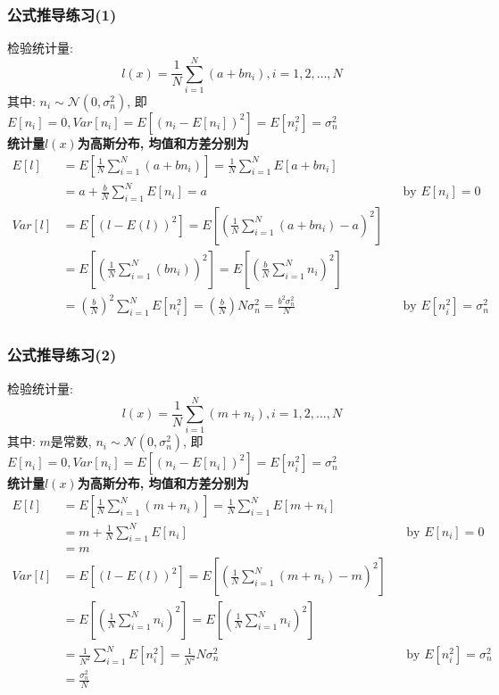 \begin{frame}[shrink]
\frametitle{公式推导练习(1)}
检验统计量:
\[l(x)=\frac{1}{N}\sum\limits_{i=1}^{N}(a+bn_i), i=1,2,\dots,N\]
其中: $n_i\sim\mathcal{N}(0,\sigma_n^2)$, 即$E[n_i]=0,Var[n_i]=E\left[(n_i-E[n_i])^2\right]=E[n_i^2]=\sigma_n^2$\\
\textbf{统计量$l(x)$为高斯分布, 均值和方差分别为}
\begin{align*}
E[l]&=E\left[\frac{1}{N}\sum\limits_{i=1}^{N}(a+bn_i)\right]=\frac{1}{N}\sum\limits_{i=1}^{N}E[a+bn_i]\\
&=a+\frac{b}{N}\sum\limits_{i=1}^{N}E[n_i]=a &&\text{by } E[n_i]=0\\
Var[l]&=E[(l-E(l))^2]=E\left[\left(\frac{1}{N}\sum\limits_{i=1}^{N}(a+bn_i)-a\right)^2\right]\\
&=E\left[\left(\frac{1}{N}\sum\limits_{i=1}^{N}(bn_i)\right)^2\right]=E\left[\left(\frac{b}{N}\sum\limits_{i=1}^{N}n_i\right)^2\right]\\
&=\left(\frac{b}{N}\right)^2\sum\limits_{i=1}^{N}E[n_i^2]=(\frac{b}{N})N\sigma_n^2=\frac{b^2\sigma_n^2}{N} &&\text{by } E[n_i^2]=\sigma_n^2\\
\end{align*}
\end{frame}

\begin{frame}[shrink]
\frametitle{公式推导练习(2)}
检验统计量:
\[l(x)=\frac{1}{N}\sum\limits_{i=1}^{N}(m+n_i),i=1,2,\dots,N\]
其中: $m$是常数, $n_i\sim\mathcal{N}(0,\sigma_n^2)$, 即$E[n_i]=0,Var[n_i]=E\left[(n_i-E[n_i])^2\right]=E[n_i^2]=\sigma_n^2$\\
\textbf{统计量$l(x)$为高斯分布, 均值和方差分别为}
\begin{align*}
E[l]&=E\left[\frac{1}{N}\sum\limits_{i=1}^{N}(m+n_i)\right]=\frac{1}{N}\sum\limits_{i=1}^{N}E[m+n_i]\\
&=m+\frac{1}{N}\sum\limits_{i=1}^{N}E[n_i] &&\text{by } E[n_i]=0\\
&=m\\
Var[l]&=E[(l-E(l))^2]=E\left[\left(\frac{1}{N}\sum\limits_{i=1}^{N}(m+n_i)-m\right)^2\right]\\
&=E\left[\left(\frac{1}{N}\sum\limits_{i=1}^{N}n_i\right)^2\right]=E\left[\left(\frac{1}{N}\sum\limits_{i=1}^{N}n_i\right)^2\right]\\
&=\frac{1}{N^2}\sum\limits_{i=1}^{N}E[n_i^2]=\frac{1}{N^2}N\sigma_n^2 &&\text{by } E[n_i^2]=\sigma_n^2\\
&=\frac{\sigma_n^2}{N}
\end{align*}
\end{frame}

